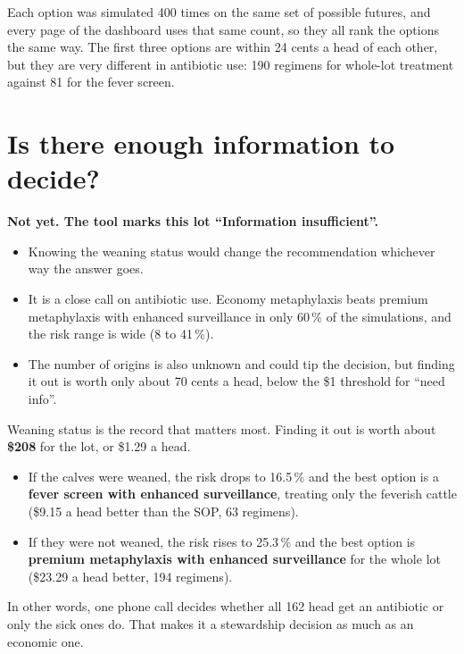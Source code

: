\documentclass[10pt,letterpaper]{article}
\newcommand{\pct}{\,\%}
\newcommand{\usd}[1]{\$#1}
\begin{document}
Each option was simulated 400 times on the same set of possible futures, and every page of the dashboard uses that same count, so they all rank the options the same way. The first three options are within 24 cents a head of each other, but they are very different in antibiotic use: 190 regimens for whole-lot treatment against 81 for the fever screen.

\section{Is there enough information to decide?}

\begin{tcolorbox}[colback=warnbg,colframe=warn,boxrule=0.6pt,arc=2pt,left=6pt,right=6pt,top=4pt,bottom=4pt]
\textbf{\color{warn}Not yet. The tool marks this lot ``Information insufficient''.}
\begin{itemize}
  \item Knowing the weaning status would change the recommendation whichever way the answer goes.
  \item It is a close call on antibiotic use. Economy metaphylaxis beats premium metaphylaxis with enhanced surveillance in only 60\pct{} of the simulations, and the risk range is wide (8 to 41\pct).
  \item The number of origins is also unknown and could tip the decision, but finding it out is worth only about 70 cents a head, below the \usd{1} threshold for ``need info''.
\end{itemize}
\end{tcolorbox}

Weaning status is the record that matters most. Finding it out is worth about \textbf{\usd{208}} for the lot, or \usd{1.29} a head.
\begin{itemize}
  \item If the calves were weaned, the risk drops to 16.5\pct{} and the best option is a \textbf{fever screen with enhanced surveillance}, treating only the feverish cattle (\usd{9.15} a head better than the SOP, 63 regimens).
  \item If they were not weaned, the risk rises to 25.3\pct{} and the best option is \textbf{premium metaphylaxis with enhanced surveillance} for the whole lot (\usd{23.29} a head better, 194 regimens).
\end{itemize}
In other words, one phone call decides whether all 162 head get an antibiotic or only the sick ones do. That makes it a stewardship decision as much as an economic one.
\end{document}
